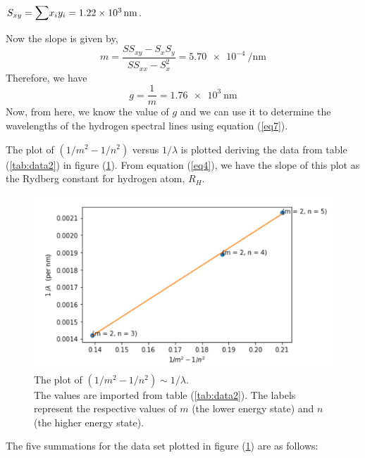 \documentclass[%
 reprint,
 amsmath,amssymb,
 aps,
]{revtex4-2}
\begin{document}
    \par
    \vspace{0.5cm}
    $S_{xy} = \mathlarger{\mathlarger{\sum}} x_{i}y_{i} = \SI{1.22e3}{\nano \metre}$.
    \par
    \vspace{0.5cm}
    Now the slope is given by,
        \begin{equation}
        \label{eq9}
            m = \dfrac{S S_{xy} - S_{x}S_{y}}{S S_{xx} - S_{x}^2} = \SI{5.70e-4}{\per \nano \metre}
        \end{equation}
    Therefore, we have
    \begin{equation}
    \label{eq10}
        \boxed{g = \dfrac{1}{m} = \SI{1.76e3}{\nano \metre}}
    \end{equation}
    Now, from here, we know the value of $g$ and we can use it to determine the wavelengths of the hydrogen spectral lines using equation (\ref{eq7}).
    \par
    The plot of $(1/m^2 - 1/n^2)$ versus $1/ \lambda$ is plotted deriving the data from table (\ref{tab:data2}) in figure (\ref{fig:plot-2}). From equation (\ref{eq4}), we have the slope of this plot as the Rydberg constant for hydrogen atom, $R_H$.
    \begin{figure}
        \centering
        \includegraphics[scale = 0.75]{Figures/plot-2.png}
        \caption{The plot of $(1/m^2 - 1/n^2) \sim 1/ \lambda$.\\ The values are imported from table (\ref{tab:data2}). The labels represent the respective values of $m$ (the lower energy state) and $n$ (the higher energy state).}
        \label{fig:plot-2}
    \end{figure}
    \par
    The five summations for the data set plotted in figure (\ref{fig:plot-2}) are as follows:
\end{document}

